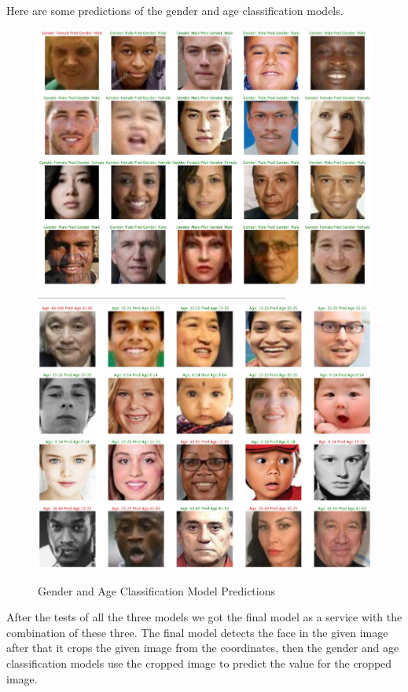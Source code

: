 \documentclass[conference]{IEEEtran}
\begin{document}
Here are some predictions of the gender and age classification models. 


\begin{figure}[H]
\centering
\includegraphics[scale=0.33]{gender_pred.jpg}
--------------------------------------------------------------------
\includegraphics[scale=0.33]{age_pred.jpg}
\caption{Gender and Age Classification Model Predictions}
\label{fig:genderpred}
\end{figure}

After the tests of all the three models we got the final model as a service with the combination of these three. The final model detects the face in the given image after that it crops the given image from the coordinates, then the gender and age classification models use the cropped image to predict the value for the cropped image.
    
\end{document}
